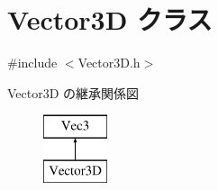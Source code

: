 \hypertarget{class_vector3_d}{}\section{Vector3D クラス}
\label{class_vector3_d}


{\ttfamily \#include $<$Vector3\+D.\+h$>$}

Vector3D の継承関係図\begin{figure}[H]
\begin{center}
\leavevmode
\includegraphics[height=2.000000cm]{class_vector3_d}
\end{center}
\end{figure}
